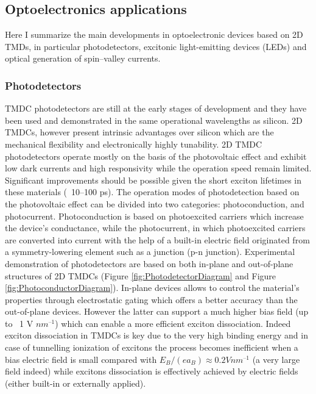 \subsection{Optoelectronics applications} 
Here I summarize the main developments in optoelectronic devices based on 2D TMDs, in particular photodetectors, excitonic light-emitting devices (LEDs) and optical generation of spin–valley currents. 

\subsubsection{Photodetectors}

TMDC photodetectors are still at the early stages of development and they have been used and demonstrated in the same operational wavelengths as silicon. 2D TMDCs, however present intrinsic advantages over silicon  which are the mechanical flexibility and electronically highly tunability.
2D TMDC photodetectors operate mostly on the basis of the photovoltaic effect and exhibit low dark currents and high responsivity while the operation speed remain limited. Significant improvements should be possible given the short exciton lifetimes in these materials (~10–100 ps)\cite{Massicotte2015}\cite{Korn2011}\cite{Wang2012}. The operation modes of photodetection based on the photovoltaic effect can be divided \cite{Sze2002} into two categories: photoconduction, and photocurrent. Photoconduction is based on photoexcited carriers which increase the device's conductance, while the photocurrent, in which photoexcited carriers are converted into current with the help of a built-in electric field originated from a symmetry-lowering element such as a junction (p-n junction).
Experimental demonstration of photodetectors are based on both in-plane and out-of-plane structures of 2D TMDCs (Figure \ref{fig:PhotodetectorDiagram} and Figure \ref{fig:PhotoconductorDiagram}). In-plane devices allows to control the material's properties through electrostatic gating which offers a better accuracy than the out-of-plane devices. However the latter can support a much higher bias field (up to ~1 V $nm^{–1}$) which can enable a more efficient exciton dissociation. Indeed exciton dissociation in TMDCs is key due to the very high binding energy and in case of tunnelling ionization of excitons the process becomes inefficient when a bias electric field is small compared with $E_B/(ea_B) \approx 0.2 V nm^{–1}$ (a very large field indeed)\cite{Haug1994} while excitons dissociation is effectively achieved by electric fields (either built-in or externally applied).

